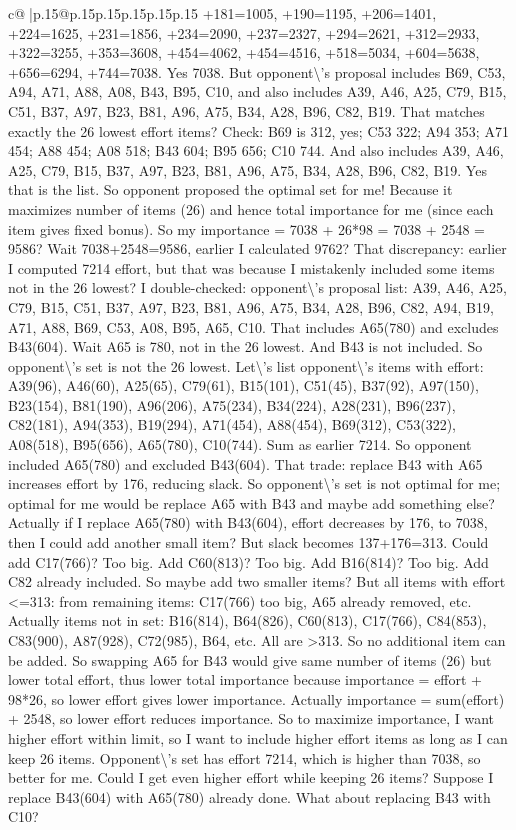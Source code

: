 \documentclass{article}
\begin{document}
{\begin{supertabular}{c@{$\;$}|p{.15\linewidth}@{}p{.15\linewidth}p{.15\linewidth}p{.15\linewidth}p{.15\linewidth}p{.15\linewidth}}
{{{+181=1005, +190=1195, +206=1401, +224=1625, +231=1856, +234=2090, +237=2327, +294=2621, +312=2933, +322=3255, +353=3608, +454=4062, +454=4516, +518=5034, +604=5638, +656=6294, +744=7038. Yes 7038. But opponent\textbackslash{}'s proposal includes B69, C53, A94, A71, A88, A08, B43, B95, C10, and also includes A39, A46, A25, C79, B15, C51, B37, A97, B23, B81, A96, A75, B34, A28, B96, C82, B19. That matches exactly the 26 lowest effort items? Check: B69 is 312, yes; C53 322; A94 353; A71 454; A88 454; A08 518; B43 604; B95 656; C10 744. And also includes A39, A46, A25, C79, B15, B37, A97, B23, B81, A96, A75, B34, A28, B96, C82, B19. Yes that is the list. So opponent proposed the optimal set for me! Because it maximizes number of items (26) and hence total importance for me (since each item gives fixed bonus). So my importance = 7038 + 26*98 = 7038 + 2548 = 9586? Wait 7038+2548=9586, earlier I calculated 9762? That discrepancy: earlier I computed 7214 effort, but that was because I mistakenly included some items not in the 26 lowest? I double{-}checked: opponent\textbackslash{}'s proposal list: A39, A46, A25, C79, B15, C51, B37, A97, B23, B81, A96, A75, B34, A28, B96, C82, A94, B19, A71, A88, B69, C53, A08, B95, A65, C10. That includes A65(780) and excludes B43(604). Wait A65 is 780, not in the 26 lowest. And B43 is not included. So opponent\textbackslash{}'s set is not the 26 lowest. Let\textbackslash{}'s list opponent\textbackslash{}'s items with effort: A39(96), A46(60), A25(65), C79(61), B15(101), C51(45), B37(92), A97(150), B23(154), B81(190), A96(206), A75(234), B34(224), A28(231), B96(237), C82(181), A94(353), B19(294), A71(454), A88(454), B69(312), C53(322), A08(518), B95(656), A65(780), C10(744). Sum as earlier 7214. So opponent included A65(780) and excluded B43(604). That trade: replace B43 with A65 increases effort by 176, reducing slack. So opponent\textbackslash{}'s set is not optimal for me; optimal for me would be replace A65 with B43 and maybe add something else? Actually if I replace A65(780) with B43(604), effort decreases by 176, to 7038, then I could add another small item? But slack becomes 137+176=313. Could add C17(766)? Too big. Add C60(813)? Too big. Add B16(814)? Too big. Add C82 already included. So maybe add two smaller items? But all items with effort <=313: from remaining items: C17(766) too big, A65 already removed, etc. Actually items not in set: B16(814), B64(826), C60(813), C17(766), C84(853), C83(900), A87(928), C72(985), B64, etc. All are >313. So no additional item can be added. So swapping A65 for B43 would give same number of items (26) but lower total effort, thus lower total importance because importance = effort + 98*26, so lower effort gives lower importance. Actually importance = sum(effort) + 2548, so lower effort reduces importance. So to maximize importance, I want higher effort within limit, so I want to include higher effort items as long as I can keep 26 items. Opponent\textbackslash{}'s set has effort 7214, which is higher than 7038, so better for me. Could I get even higher effort while keeping 26 items? Suppose I replace B43(604) with A65(780) already done. What about replacing B43 with C10? }}}
\end{supertabular}}
\end{document}
